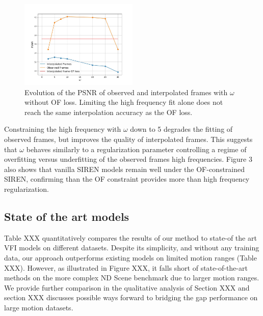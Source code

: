 \documentclass{article}
\begin{document}
\begin{figure}[t]
\centering
\includegraphics[width=0.5\textwidth]{"omega_wo_of"}
\caption{Evolution of the PSNR of observed and interpolated frames with $\omega$ without OF loss.
Limiting the high frequency fit alone does not reach the same interpolation accuracy as the OF loss.}
\end{figure}

Constraining the high frequency with $\omega$ down to 5 degrades the fitting of observed frames,
but improves the quality of interpolated frames.
This suggests that $\omega$ behaves similarly to a regularization parameter
controlling a regime of overfitting versus underfitting of the observed frames high frequencies.
Figure 3 also shows that vanilla SIREN models remain well under the OF-constrained SIREN,
confirming than the OF constraint provides more than high frequency regularization.

\subsection{State of the art models}
\label{sec_sota}
Table XXX quantitatively compares the results of our method to state-of the art VFI models on different datasets.
Despite its simplicity, and without any training data, our approach outperforms existing models on limited motion ranges (Table XXX).
However, as illustrated in Figure XXX, it falls short of state-of-the-art methods on the more complex ND Scene benchmark due to larger motion ranges.
We provide further comparison in the qualitative analysis of Section XXX and section XXX discusses possible ways forward
to bridging the gap performance on large motion datasets.
\end{document}
